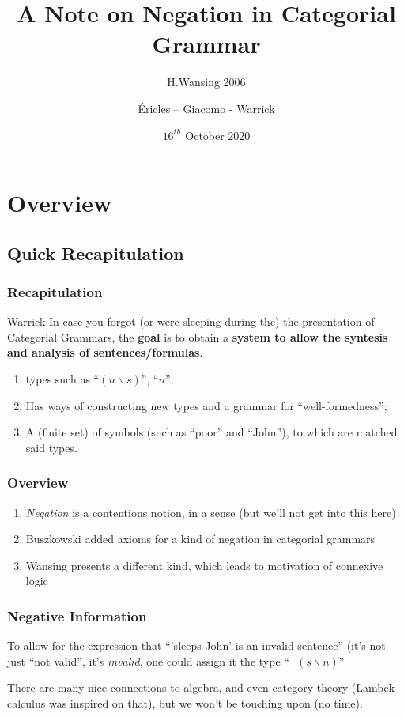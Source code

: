 \documentclass{beamer}
\title{A Note on Negation in Categorial Grammar}
\subtitle{H.Wansing 2006}
\author{Éricles -- Giacomo - Warrick}
\date{$16^{th}$ October 2020}
\begin{document}
\begin{frame}
  \titlepage
\end{frame}



\section{Overview}

\subsection{Quick Recapitulation}
\begin{frame}
\frametitle{Recapitulation}
Warrick In case you forgot (or were sleeping during the) the presentation of Categorial
Grammars, the \textbf{goal} is to obtain a \textbf{system to allow the
  syntesis and analysis of sentences/formulas}.

\begin{enumerate}
\item types such as ``$(n \backslash s)$'', ``$n$'';
\item Has ways of constructing new types and a grammar for
  ``well-formedness'';
\item A (finite set) of symbols (such as ``poor'' and ``John''), to
  which are matched said types.
\end{enumerate}
\end{frame}

\begin{frame}
  \frametitle{Overview}

\begin{enumerate}
\item \textit{Negation} is a contentions notion, in a sense (but we'll
  not get into this here)
\item Buszkowski added axioms for a kind of negation in categorial
  grammars
\item Wansing presents a different kind, which leads to motivation
  of connexive logic
\end{enumerate}
\end{frame}

\begin{frame}
  \frametitle{Negative Information}
  To allow for the expression that ``'sleeps John' is an invalid
  sentence'' (it's not just ``not valid'', it's \textit{invalid}, one could assign it the type ``$¬(s\backslash n)$''
  
  There are many nice connections to algebra, and even category theory (Lambek calculus was inspired on that), but we won't be touching upon (no time).
  
\end{frame}
  
\end{document}
